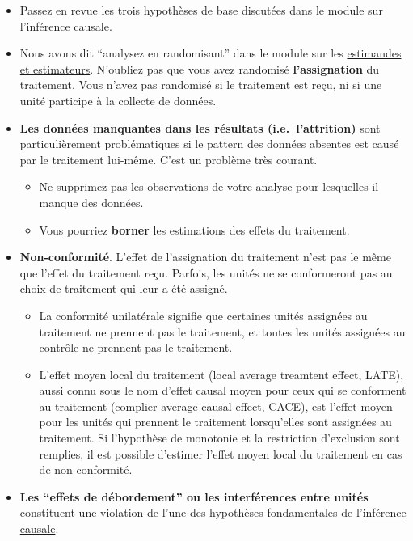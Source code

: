 \documentclass[
  12pt,
]{book}
\begin{document}
\begin{itemize}
\item
  Passez en revue les trois hypothèses de base discutées dans le module sur \href{causal-inference.html}{l'inférence causale}.
\item
  Nous avons dit ``analysez en randomisant'' dans le module sur les \href{estimands-and-estimators.html}{estimandes et estimateurs}. N'oubliez pas que vous avez randomisé \textbf{l'assignation} du traitement. Vous n'avez pas randomisé si le traitement est reçu, ni si une unité participe à la collecte de données.
\item
  \textbf{Les données manquantes dans les résultats (i.e.~l'attrition)} sont particulièrement problématiques si le pattern des données absentes est causé par le traitement lui-même. C'est un problème très courant.

  \begin{itemize}
  \item
    Ne supprimez pas les observations de votre analyse pour lesquelles il manque des données.
  \item
    Vous pourriez \textbf{borner} les estimations des effets du traitement.
  \end{itemize}
\item
  \textbf{Non-conformité}. L'effet de l'assignation du traitement n'est pas le même que l'effet du traitement reçu. Parfois, les unités ne se conformeront pas au choix de traitement qui leur a été assigné.

  \begin{itemize}
  \item
    La conformité unilatérale signifie que certaines unités assignées au traitement ne prennent pas le traitement, et toutes les unités assignées au contrôle ne prennent pas le traitement.
  \item
    L'effet moyen local du traitement (local average treamtent effect, LATE), aussi connu sous le nom d'effet causal moyen pour ceux qui se conforment au traitement (complier average causal effect, CACE), est l'effet moyen pour les unités qui prennent le traitement lorsqu'elles sont assignées au traitement. Si l'hypothèse de monotonie et la restriction d'exclusion sont remplies, il est possible d'estimer l'effet moyen local du traitement en cas de non-conformité.
  \end{itemize}
\item
  \textbf{Les ``effets de débordement'' ou les interférences entre unités} constituent une violation de l'une des hypothèses fondamentales de l'\href{causalinference.html}{inférence causale}.


\end{itemize}
\end{document}
